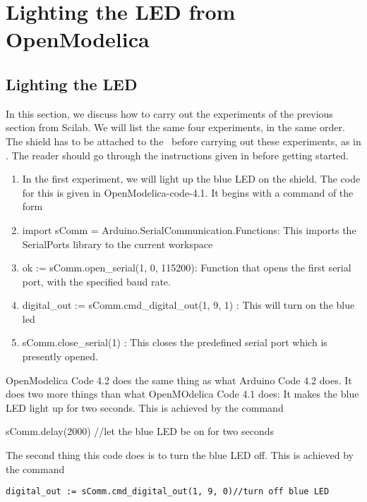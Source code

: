 \section{Lighting the LED from OpenModelica}
\subsection{Lighting the LED}
\label{sec:light-OpenModelica}
In this section, we discuss how to carry out the experiments of the
previous section from Scilab.  We will list the same four experiments,
in the same order.  The shield has to be attached to the \arduino\
before carrying out these experiments, as in .
The reader should go through the instructions given in
 before getting started.

\begin{enumerate}
\item In the first experiment, we will light up the blue LED on the
  shield.  The code for this is given in OpenModelica-code-4.1.
    It begins with a command of the form

\item import sComm = Arduino.SerialCommunication.Functions: This imports the SerialPorts library to the current workspace
\item ok := sComm.open\_serial(1, 0, 115200): Function that opens the first serial port, with the specified baud rate.
 
\item digital\_out := sComm.cmd\_digital\_out(1, 9, 1) : This will turn on the blue led
 
\item sComm.close\_serial(1) : This closes the predefined serial port which is presently opened.
\end{enumerate}

OpenModelica Code 4.2 does the same thing as what Arduino Code 4.2 does. It does
two more things than what OpenMOdelica Code 4.1 does: It makes the blue LED light
up for two seconds. This is achieved by the command

sComm.delay(2000)  //let the blue LED be on for two seconds

The second thing this code does is to turn the blue LED off. This is achieved
by the command

\begin{lstlisting}[style=nonumbers]
     digital_out := sComm.cmd_digital_out(1, 9, 0)//turn off blue LED
  \end{lstlisting}

